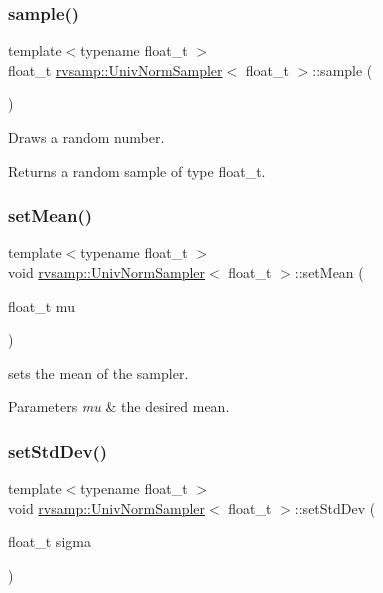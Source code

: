 \subsubsection{\texorpdfstring{sample()}{sample()}}
{\footnotesize\ttfamily template$<$typename float\+\_\+t $>$ \\
float\+\_\+t \hyperlink{classrvsamp_1_1UnivNormSampler}{rvsamp\+::\+Univ\+Norm\+Sampler}$<$ float\+\_\+t $>$\+::sample (\begin{DoxyParamCaption}{ }\end{DoxyParamCaption})}



Draws a random number. 

\begin{DoxyReturn}{Returns}
a random sample of type float\+\_\+t. 
\end{DoxyReturn}
\mbox{\label{classrvsamp_1_1UnivNormSampler_a3969ca7da7cbea29ba766b3a87713049}} 
\subsubsection{\texorpdfstring{set\+Mean()}{setMean()}}
{\footnotesize\ttfamily template$<$typename float\+\_\+t $>$ \\
void \hyperlink{classrvsamp_1_1UnivNormSampler}{rvsamp\+::\+Univ\+Norm\+Sampler}$<$ float\+\_\+t $>$\+::set\+Mean (\begin{DoxyParamCaption}\item[{float\+\_\+t}]{mu }\end{DoxyParamCaption})}



sets the mean of the sampler. 


\begin{DoxyParams}{Parameters}
{\em mu} & the desired mean. \\
\hline
\end{DoxyParams}
\mbox{\label{classrvsamp_1_1UnivNormSampler_a251f76fd8e9aa078d16bc01e53406681}} 
\subsubsection{\texorpdfstring{set\+Std\+Dev()}{setStdDev()}}
{\footnotesize\ttfamily template$<$typename float\+\_\+t $>$ \\
void \hyperlink{classrvsamp_1_1UnivNormSampler}{rvsamp\+::\+Univ\+Norm\+Sampler}$<$ float\+\_\+t $>$\+::set\+Std\+Dev (\begin{DoxyParamCaption}\item[{float\+\_\+t}]{sigma }\end{DoxyParamCaption})}



